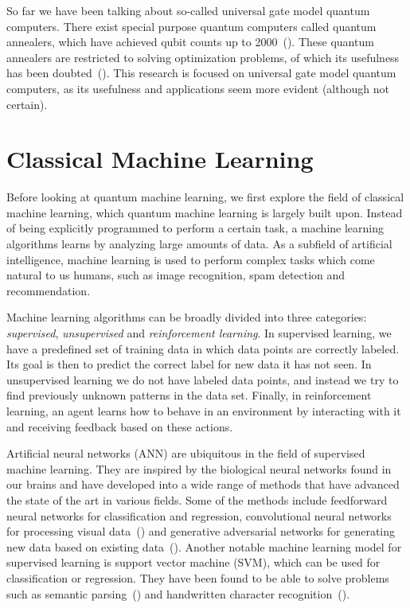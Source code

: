 \documentclass[a4paper,10pt]{article}
\begin{document}
So far we have been talking about so-called universal gate model quantum computers.
There exist special purpose quantum computers called quantum annealers, which have achieved qubit counts up to 2000~(\cite{dwave-2000}).
These quantum annealers are restricted to solving optimization problems, of which its usefulness has been doubted~(\cite{how-quantum-dwave, aaronson-dwave, detecting-quantum-speedup}).
This research is focused on universal gate model quantum computers, as its usefulness and applications seem more evident (although not certain).

\section{Classical Machine Learning} \label{sec:classical-ml}
Before looking at quantum machine learning, we first explore the field of classical machine learning, which quantum machine learning is largely built upon.
Instead of being explicitly programmed to perform a certain task, a machine learning algorithms learns by analyzing large amounts of data.
As a subfield of artificial intelligence, machine learning is used to perform complex tasks which come natural to us humans, such as image recognition, spam detection and recommendation.

Machine learning algorithms can be broadly divided into three categories: \emph{supervised}, \emph{unsupervised} and \emph{reinforcement learning}.
In supervised learning, we have a predefined set of training data in which data points are correctly labeled.
Its goal is then to predict the correct label for new data it has not seen.
In unsupervised learning we do not have labeled data points, and instead we try to find previously unknown patterns in the data set.
Finally, in reinforcement learning, an agent learns how to behave in an environment by interacting with it and receiving feedback based on these actions.

Artificial neural networks (ANN) are ubiquitous in the field of supervised machine learning.
They are inspired by the biological neural networks found in our brains and have developed into a wide range of methods that have advanced the state of the art in various fields.
Some of the methods include feedforward neural networks for classification and regression, convolutional neural networks for processing visual data~(\cite{cirecsan2012multi}) and generative adversarial networks for generating new data based on existing data~(\cite{goodfellow2014generative}).
Another notable machine learning model for supervised learning is support vector machine (SVM), which can be used for classification or regression.
They have been found to be able to solve problems such as semantic parsing~(\cite{pradhan2004shallow}) and handwritten character recognition~(\cite{decoste2002training}).
\end{document}

